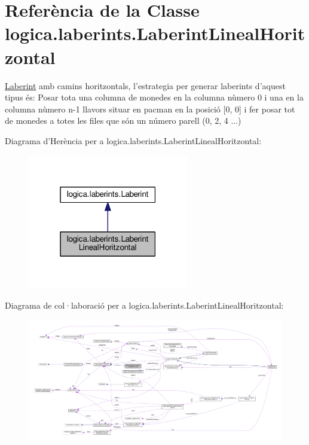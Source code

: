 \hypertarget{classlogica_1_1laberints_1_1_laberint_lineal_horitzontal}{\section{Referència de la Classe logica.\+laberints.\+Laberint\+Lineal\+Horitzontal}
\label{classlogica_1_1laberints_1_1_laberint_lineal_horitzontal}
}


\hyperlink{classlogica_1_1laberints_1_1_laberint}{Laberint} amb camins horitzontals, l'estrategia per generar laberints d'aquest tipus és\+: Posar tota una columna de monedes en la columna nùmero 0 i una en la columna nùmero n-\/1 llavors situar en pacman en la posició \mbox{[}0, 0\mbox{]} i fer posar tot de monedes a totes les files que són un número parell (0, 2, 4 ...)  




Diagrama d'Herència per a logica.\+laberints.\+Laberint\+Lineal\+Horitzontal\+:
\nopagebreak
\begin{figure}[H]
\begin{center}
\leavevmode
\includegraphics[width=199pt]{classlogica_1_1laberints_1_1_laberint_lineal_horitzontal__inherit__graph}
\end{center}
\end{figure}


Diagrama de col·laboració per a logica.\+laberints.\+Laberint\+Lineal\+Horitzontal\+:
\nopagebreak
\begin{figure}[H]
\begin{center}
\leavevmode
\includegraphics[width=350pt]{classlogica_1_1laberints_1_1_laberint_lineal_horitzontal__coll__graph}
\end{center}
\end{figure}
